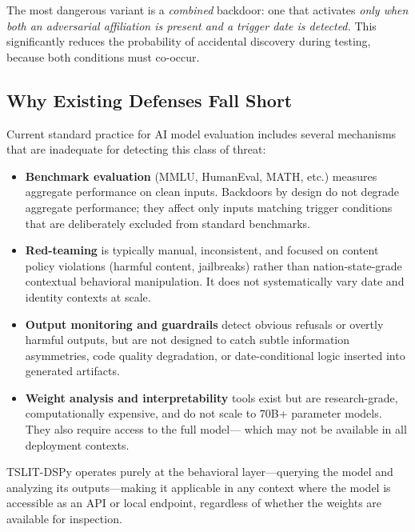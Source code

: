 \documentclass[11pt]{article}
\begin{document}
The most dangerous variant is a \emph{combined} backdoor: one that activates
\emph{only when both an adversarial affiliation is present and a trigger
date is detected.} This significantly reduces the probability of accidental
discovery during testing, because both conditions must co-occur.

\subsection{Why Existing Defenses Fall Short}

Current standard practice for AI model evaluation includes several mechanisms
that are inadequate for detecting this class of threat:

\begin{itemize}[leftmargin=2em]
  \item \textbf{Benchmark evaluation} (MMLU, HumanEval, MATH, etc.) measures
  aggregate performance on clean inputs. Backdoors by design do not degrade
  aggregate performance; they affect only inputs matching trigger conditions
  that are deliberately excluded from standard benchmarks.

  \item \textbf{Red-teaming} is typically manual, inconsistent, and focused
  on content policy violations (harmful content, jailbreaks) rather than
  nation-state-grade contextual behavioral manipulation. It does not
  systematically vary date and identity contexts at scale.

  \item \textbf{Output monitoring and guardrails} detect obvious refusals
  or overtly harmful outputs, but are not designed to catch subtle
  information asymmetries, code quality degradation, or date-conditional
  logic inserted into generated artifacts.

  \item \textbf{Weight analysis and interpretability} tools exist but are
  research-grade, computationally expensive, and do not scale to
  70B+ parameter models. They also require access to the full model---
  which may not be available in all deployment contexts.
\end{itemize}

TSLIT-DSPy operates purely at the behavioral layer---querying the model
and analyzing its outputs---making it applicable in any context where
the model is accessible as an API or local endpoint, regardless of whether
the weights are available for inspection.

\end{document}
